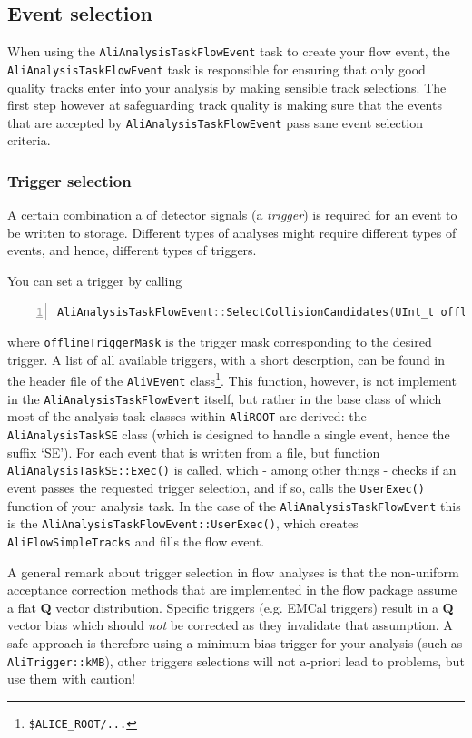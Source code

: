 \documentclass[a4paper]{book}
\numberwithin{equation}{subsection}
\begin{document}
\subsection{Event selection}
When using the \texttt{AliAnalysisTaskFlowEvent} task to create your flow event, the \texttt{AliAnalysisTaskFlowEvent} task is responsible for ensuring that only good quality tracks enter into your analysis by making sensible track selections. The first step however at safeguarding track quality is making sure that the events that are accepted by \texttt{AliAnalysisTaskFlowEvent} pass sane event selection criteria. 

\subsubsection{Trigger selection}
A certain combination a of detector signals (a \emph{trigger}) is required for an event to be written to storage. Different types of analyses might require different types of events, and hence, different types of triggers. 

You can set a trigger by calling
\begin{lstlisting}[language=C, numbers=left]
AliAnalysisTaskFlowEvent::SelectCollisionCandidates(UInt_t offlineTriggerMask);\end{lstlisting}
where \texttt{offlineTriggerMask} is the trigger mask corresponding to the desired trigger. A list of all available triggers, with a short descrption, can be found in the header file of the \texttt{AliVEvent} class\footnote{\texttt{\$ALICE\_ROOT/...}}. This function, however, is not implement in the \texttt{AliAnalysisTaskFlowEvent} itself, but rather in the base class of which most of the analysis task classes within \texttt{AliROOT} are derived: the \texttt{AliAnalysisTaskSE} class (which is designed to handle a single event, hence the suffix `SE'). For each event that is written from a file, but function \texttt{AliAnalysisTaskSE::Exec()} is called, which - among other things - checks if an event passes the requested trigger selection, and if so, calls the \texttt{UserExec()} function of your analysis task. In the case of the \texttt{AliAnalysisTaskFlowEvent} this is the \texttt{AliAnalysisTaskFlowEvent::UserExec()}, which creates \texttt{AliFlowSimpleTracks} and fills the flow event. 

A general remark about trigger selection in flow analyses is that the non-uniform acceptance correction methods that are implemented in the flow package assume a flat \textbf{Q} vector distribution. Specific triggers (e.g. EMCal triggers) result in a \textbf{Q} vector bias which should \emph{not} be corrected as they invalidate that assumption. A safe approach is therefore using a minimum bias trigger for your analysis (such as \texttt{AliTrigger::kMB}), other triggers selections will not a-priori lead to problems, but use them with caution!
\end{document}
